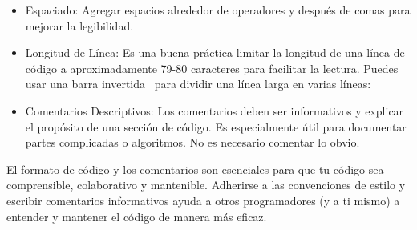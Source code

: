\begin{itemize}
    \item Espaciado: Agregar espacios alrededor de operadores y después de comas para mejorar la legibilidad.
    \begin{figure}[h]
        \centering
      \end{figure}
    \item Longitud de Línea: Es una buena práctica limitar la longitud de una línea de código a aproximadamente 79-80 caracteres para facilitar la lectura. Puedes usar una barra invertida \ para dividir una línea larga en varias líneas:
    \begin{figure}[h]
        \centering
      \end{figure}
    \item Comentarios Descriptivos: Los comentarios deben ser informativos y explicar el propósito de una sección de código. Es especialmente útil para documentar partes complicadas o algoritmos. No es necesario comentar lo obvio.
\end{itemize}

El formato de código y los comentarios son esenciales para que tu código sea comprensible, colaborativo y mantenible. Adherirse a las convenciones de estilo y escribir comentarios informativos ayuda a otros programadores (y a ti mismo) a entender y mantener el código de manera más eficaz.
